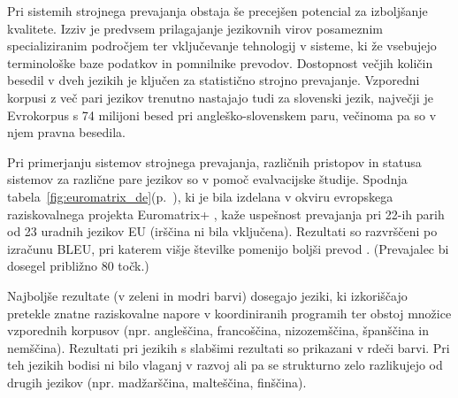 \begin{multicols}{2}
Pri sistemih stroj\-nega prevajanja obstaja še precejšen potencial za izboljšanje kvalitete. Izziv je predvsem prilagajanje jezikovnih virov posameznim specializiranim področjem ter vključevanje tehnologij v sisteme, ki že vsebujejo terminološke baze podatkov in pomnilnike prevodov. Dostopnost večjih količin besedil v dveh jezikih je ključen za statistično stroj\-no prevajanje. Vzporedni korpusi z več pari jezikov trenutno nastajajo tudi za slovenski jezik, naj\-večji je Evrokorpus s 74 mili\-joni besed pri angleško-slovenskem paru, večinoma pa so v njem pravna besedila.

Pri primerjanju sistemov stroj\-nega prevajanja, različnih pristopov in statusa sistemov za različne pare jezikov so v pomoč evalvacij\-ske študije. Spodnja tabela~\ref{fig:euromatrix_de}(p.~\pageref{fig:euromatrix_de}), ki je bila izdelana v okviru evropskega raziskovalnega projekta Euromatrix+ \cite{euro1}, kaže uspešnost prevajanja pri 22-ih parih od 23 uradnih jezikov EU (irščina ni bila vključena). Rezultati so razvrščeni po izračunu BLEU, pri katerem višje številke po\-menijo boljši prevod \cite{bleu1}.  (Prevajalec bi dosegel približno 80 točk.) 


Naj\-boljše rezultate (v zeleni in modri barvi) dosegajo jeziki, ki izkoriščajo pretekle znatne raziskovalne napore v koordiniranih programih ter obstoj množice vzporednih korpusov (npr. angleščina, francoščina, nizozemščina, španščina in nemščina). Rezultati pri jezikih s slabšimi rezultati so prikazani v rdeči barvi. Pri teh jezikih bodisi ni bilo vlaganj v razvoj ali pa se strukturno zelo razlikujejo od drugih jezikov (npr. madžarščina, malteščina, finščina).


\end{multicols}
